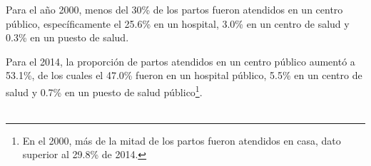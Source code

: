Para el año 2000, menos del 30\% de los partos fueron atendidos en un centro público, específicamente el  25.6\% en un hospital, 3.0\% en un centro de salud y 0.3\% en un puesto de salud. 

 Para el 2014, la proporción de partos atendidos en un centro público aumentó a 53.1\%, de los cuales el 47.0\% fueron en un hospital público, 5.5\% en un centro de salud y 0.7\% en un puesto de salud público\footnote{En el 2000, más de la mitad de los partos fueron atendidos en casa, dato superior al  29.8\% de 2014. }.\\\\
 